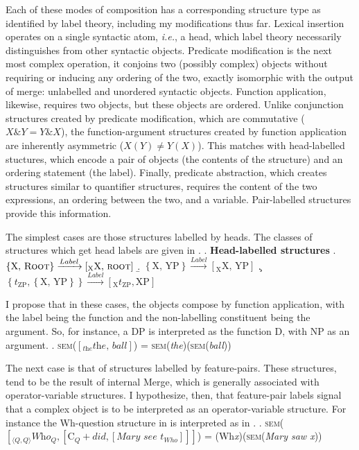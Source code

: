 \documentclass[MilwayThesis]{subfiles}
\begin{document}
Each of these modes of composition has a corresponding structure type as identified by label theory, including my modifications thus far.
Lexical insertion operates on a single syntactic atom, \textit{i.e.}, a head, which label theory necessarily distinguishes from other syntactic objects.
Predicate modification is the next most complex operation, it conjoins two (possibly complex) objects without requiring or inducing any ordering of the two, exactly isomorphic with the output of merge: unlabelled and unordered syntactic objects.
Function application, likewise, requires two objects, but these objects are ordered.
Unlike conjunction structures created by predicate modification, which are commutative ($X \& Y = Y \& X$), the function-argument structures created by function application are inherently asymmetric ($X(Y) \neq Y(X)$).
This matches with head-labelled stuctures, which encode a pair of objects (the contents of the structure) and an ordering statement (the label).
Finally, predicate abstraction, which creates structures similar to quantifier structures, requires the content of the two expressions, an ordering between the two, and a variable.
Pair-labelled structures provide this information.

The simplest cases are those structures labelled by heads.
The classes of structures which get head labels are given in \Next.
\ex. \textbf{Head-labelled structures}
\a. $\left\{ \text{X, }\textsc{Root} \right\} \xrightarrow{Label} \left[_\text{X} \text{X, }\textsc{root}  \right]$
\b. $\left\{ \text{X, YP} \right\} \xrightarrow{Label} \left[_\text{X} \text{X, YP} \right]$
\c. $\left\{ t_\text{ZP}, \left\{ \text{X, YP} \right\} \right\}\xrightarrow{Label}\left[_\text{X} t_\text{ZP}, \text{XP} \right]$

I propose that in these cases, the objects compose by function application, with the label being the function and the non-labelling constituent being the argument.
So, for instance, a DP is interpreted as the function D, with NP as an argument.
\ex. \textsc{sem}($\left[_\textit{the} \textit{the, ball} \right]$) = \textsc{sem}(\textit{the})(\textsc{sem}(\textit{ball}))

The next case is that of structures labelled by feature-pairs.
These structures, tend to be the result of internal Merge, which is generally associated with operator-variable structures.
I hypothesize, then, that feature-pair labels signal that a complex object is to be interpreted as an operator-variable structure.
For instance the Wh-question structure in \Next[a] is interpreted as in \Next[b].
\ex. \textsc{sem}($\left[_{\langle Q,Q \rangle} \textit{Who}_Q, \left[ \text{C}_Q+\textit{did}, \left[ \textit{Mary see } t_{Who} \right] \right]  \right]$) = (Wh\textit{x})(\textsc{sem}(\textit{Mary saw x}))
\end{document}
